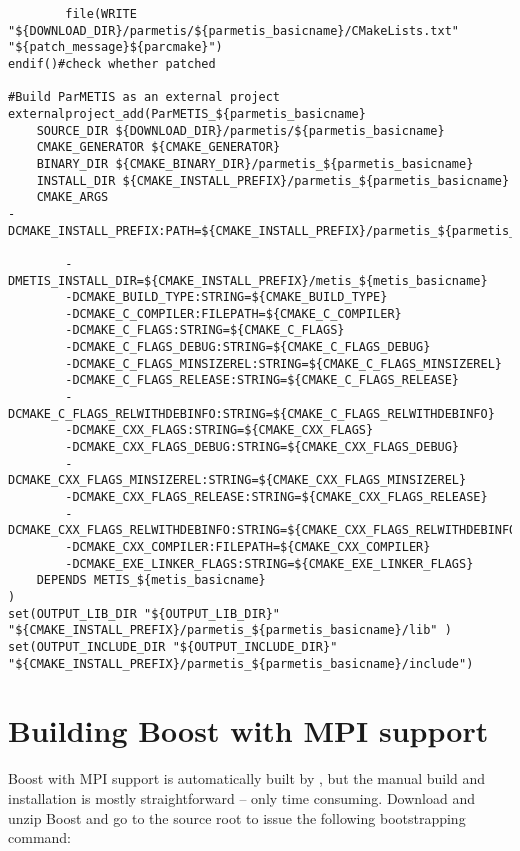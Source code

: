 \documentclass[10pt,a4paper]{article}
\newcommand{\bs}{\ensuremath{\backslash}}
\begin{document}
\begin{codeparchment}
\begin{lstlisting}
		file(WRITE "${DOWNLOAD_DIR}/parmetis/${parmetis_basicname}/CMakeLists.txt"
"${patch_message}${parcmake}")
endif()#check whether patched

#Build ParMETIS as an external project
externalproject_add(ParMETIS_${parmetis_basicname}
	SOURCE_DIR ${DOWNLOAD_DIR}/parmetis/${parmetis_basicname}
	CMAKE_GENERATOR ${CMAKE_GENERATOR}
	BINARY_DIR ${CMAKE_BINARY_DIR}/parmetis_${parmetis_basicname}
	INSTALL_DIR ${CMAKE_INSTALL_PREFIX}/parmetis_${parmetis_basicname}
	CMAKE_ARGS
-DCMAKE_INSTALL_PREFIX:PATH=${CMAKE_INSTALL_PREFIX}/parmetis_${parmetis_basicname}

		-DMETIS_INSTALL_DIR=${CMAKE_INSTALL_PREFIX}/metis_${metis_basicname}
		-DCMAKE_BUILD_TYPE:STRING=${CMAKE_BUILD_TYPE}
  		-DCMAKE_C_COMPILER:FILEPATH=${CMAKE_C_COMPILER}
  		-DCMAKE_C_FLAGS:STRING=${CMAKE_C_FLAGS}
    	-DCMAKE_C_FLAGS_DEBUG:STRING=${CMAKE_C_FLAGS_DEBUG}
    	-DCMAKE_C_FLAGS_MINSIZEREL:STRING=${CMAKE_C_FLAGS_MINSIZEREL}
    	-DCMAKE_C_FLAGS_RELEASE:STRING=${CMAKE_C_FLAGS_RELEASE}
    	-DCMAKE_C_FLAGS_RELWITHDEBINFO:STRING=${CMAKE_C_FLAGS_RELWITHDEBINFO}
    	-DCMAKE_CXX_FLAGS:STRING=${CMAKE_CXX_FLAGS}
    	-DCMAKE_CXX_FLAGS_DEBUG:STRING=${CMAKE_CXX_FLAGS_DEBUG}
    	-DCMAKE_CXX_FLAGS_MINSIZEREL:STRING=${CMAKE_CXX_FLAGS_MINSIZEREL}
    	-DCMAKE_CXX_FLAGS_RELEASE:STRING=${CMAKE_CXX_FLAGS_RELEASE}
    	-DCMAKE_CXX_FLAGS_RELWITHDEBINFO:STRING=${CMAKE_CXX_FLAGS_RELWITHDEBINFO}
    	-DCMAKE_CXX_COMPILER:FILEPATH=${CMAKE_CXX_COMPILER}
    	-DCMAKE_EXE_LINKER_FLAGS:STRING=${CMAKE_EXE_LINKER_FLAGS}
	DEPENDS METIS_${metis_basicname}
)
set(OUTPUT_LIB_DIR "${OUTPUT_LIB_DIR}"
"${CMAKE_INSTALL_PREFIX}/parmetis_${parmetis_basicname}/lib" )
set(OUTPUT_INCLUDE_DIR "${OUTPUT_INCLUDE_DIR}"
"${CMAKE_INSTALL_PREFIX}/parmetis_${parmetis_basicname}/include")

\end{lstlisting}
\end{codeparchment}

\section{Building Boost with MPI support}
Boost with MPI support is automatically built by \chastelibbuilder, but the
manual build and installation is mostly straightforward -- only time consuming. 
Download and unzip Boost and go to the source root to issue the following
bootstrapping
command:
\begin{center}
\declaration{
\$BOOST\_SRC$>$ .\bs bootstrap
}
\end{center}
\end{document}
